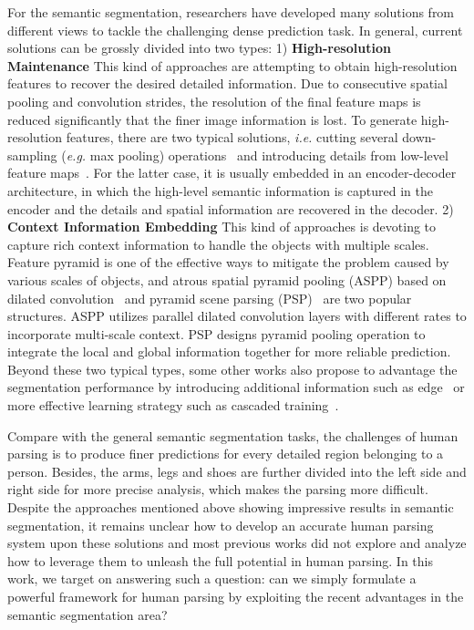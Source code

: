 \documentclass[letterpaper]{article} \usepackage{formatting-instructions-latex-2019}  \usepackage{times}  \usepackage{helvet}  \usepackage{courier}  \usepackage{url}  \usepackage{graphicx}  \frenchspacing  \setlength{\pdfpagewidth}{8.5in}  \setlength{\pdfpageheight}{11in}
\newcommand{\eg}{\emph{e.g. }}
\newcommand{\ie}{\emph{i.e. }}
\begin{document}
For the semantic segmentation, researchers have developed many solutions from different views to tackle the challenging dense prediction task. In general, current solutions can be grossly divided into two types: 1) \textbf{High-resolution Maintenance} This kind of approaches are attempting to obtain high-resolution features to recover the desired detailed information. Due to consecutive spatial pooling and convolution strides, the resolution of the final feature maps is reduced significantly that the finer image information is lost. To generate high-resolution features, there are two typical solutions, \ie cutting several down-sampling (\eg max pooling) operations~\cite{Chen2016} and introducing details from low-level feature maps~\cite{Chen2018a}. For the latter case, it is usually embedded in an encoder-decoder architecture, in which the high-level semantic information is captured in the encoder and the details and spatial information are recovered in the decoder. 2) \textbf{Context Information Embedding} This kind of approaches is devoting to capture rich context information to handle the objects with multiple scales. Feature pyramid is one of the effective ways to mitigate the problem caused by various scales of objects, and atrous spatial pyramid pooling (ASPP) based on dilated convolution~\cite{Chen2018} and pyramid scene parsing (PSP)~\cite{Zhao2017} are two popular structures. ASPP utilizes parallel dilated convolution layers with different rates to incorporate multi-scale context. PSP designs pyramid pooling operation to integrate the local and global information together for more reliable prediction. Beyond these two typical types, some other works also propose to advantage the segmentation performance by introducing additional information such as edge~\cite{Liang2017,liumagic} or more effective learning strategy such as cascaded training~\cite{Li_2017_CVPR}.



Compare with the general semantic segmentation tasks, the challenges of human parsing is to produce finer predictions for every detailed region belonging to a person. Besides, the arms, legs and shoes are further divided into the left side and right side for more precise analysis, which makes the parsing more difficult. Despite the approaches mentioned above showing impressive results in semantic segmentation, it remains unclear how to develop an accurate human parsing system upon these solutions and most previous works did not explore and analyze how to leverage them to unleash the full potential in human parsing. In this work, we target on answering such a question: can we simply formulate a powerful framework for human parsing by exploiting the recent advantages in the semantic segmentation area?
  
\end{document}
